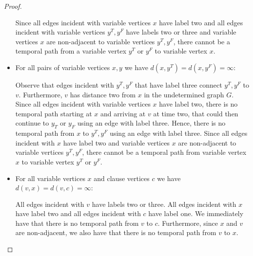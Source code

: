 \documentclass[11pt,a4paper]{article}
\theoremstyle{remark}
\theoremstyle{definition}
\begin{document}
\begin{proof}
\begin{itemize}
Since all edges incident with variable vertices $x$ have label two and all edges incident with variable vertices $y^T, y^F$ have labels two or three and variable vertices $x$ are non-adjacent to variable vertices $y^T,y^F$, there cannot be a temporal path from a variable vertex $y^T$ or $y^F$ to variable vertex $x$.
\item For all pairs of variable vertices $x,y$ we have $d(x,y^T)=d(x,y^F)=\infty$:

Observe that edges incident with $y^T, y^F$ that have label three connect $y^T, y^F$ to $v$. Furthermore, $v$ has distance two from $x$ in the undetermined graph $G$. Since all edges incident with variable vertices $x$ have label two, there is no temporal path starting at $x$ and arriving at $v$ at time two, that could then continue to $y_T$ or $y_F$ using an edge with label three. Hence, there is no temporal path from $x$ to $y^T, y^F$ using an edge with label three. Since all edges incident with $x$ have label two and variable vertices $x$ are non-adjacent to variable vertices $y^T,y^F$, there cannot be a temporal path from variable vertex $x$ to variable vertex $y^T$ or $y^F$.
\item For all variable vertices $x$ and clause vertices $c$ we have $d(v,x)=d(v,c)=\infty$:

All edges incident with $v$ have labels two or three. All edges incident with $x$ have label two and all edges incident with $c$ have label one. We immediately have that there is no temporal path from $v$ to $c$. Furthermore, since $x$ and $v$ are non-adjacent, we also have that there is no temporal path from $v$ to $x$.
\end{itemize}
\end{proof}
\end{document}
